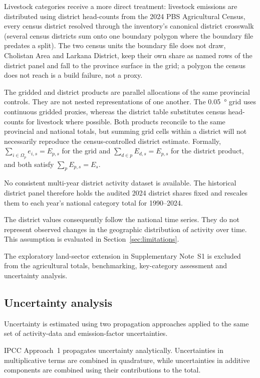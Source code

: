 Livestock categories receive a more direct treatment: livestock emissions are distributed
using district head-counts from the 2024 PBS Agricultural Census, every census district
resolved through the inventory's canonical district crosswalk (several census districts
sum onto one boundary polygon where the boundary file predates a split). The two census
units the boundary file does not draw, Cholistan Area and Larkana District, keep their own
share as named rows of the district panel and fall to the province surface in the grid; a
polygon the census does not reach is a build failure, not a proxy.

The gridded and district products are parallel allocations of the same provincial controls.
They are not nested representations of one another. The \SI{0.05}{\degree} grid uses
continuous gridded proxies, whereas the district table substitutes census head-counts for
livestock where possible. Both products reconcile to the same provincial and national
totals, but summing grid cells within a district will not necessarily reproduce the
census-controlled district estimate. Formally,
$\sum_{i\in\Omega_p}e_{i,s}=E_{p,s}$ for the grid and $\sum_{d\in p}E_{d,s}=E_{p,s}$ for the
district product, and both satisfy $\sum_p E_{p,s}=E_s$.

No consistent multi-year district activity dataset is available. The historical district
panel therefore holds the audited 2024 district shares fixed and rescales them to each year's
national category total for 1990--2024.

The district values consequently follow the national time series. They do not represent
observed changes in the geographic distribution of activity over time. This assumption is
evaluated in Section~\ref{sec:limitations}.

The exploratory land-sector extension in Supplementary Note~S1 is excluded from the
agricultural totals, benchmarking, key-category assessment and uncertainty analysis.

\subsection{Uncertainty analysis}

Uncertainty is estimated using two propagation approaches applied to the same set of
activity-data and emission-factor uncertainties.

IPCC Approach~1 propagates uncertainty analytically. Uncertainties in multiplicative terms
are combined in quadrature, while uncertainties in additive components are combined using
their contributions to the total.

